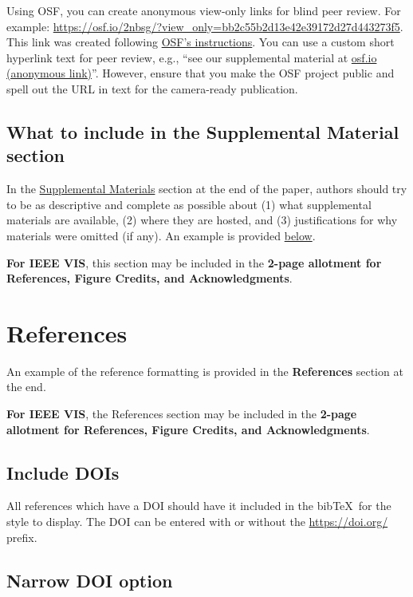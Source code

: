 \documentclass[journal]{vgtc}                     %
\begin{document}
Using OSF, you can create anonymous view-only links for blind peer review.
For example: \url{https://osf.io/2nbsg/?view_only=bb2c55b2d13e42e39172d27d443273f5}.
This link was created following \href{https://help.osf.io/article/201-create-a-view-only-link-for-a-project}{OSF's instructions}.
You can use a custom short hyperlink text for peer review, e.g., ``see our supplemental material at \href{https://osf.io/2nbsg/?view_only=bb2c55b2d13e42e39172d27d443273f5}{osf.io (anonymous link)}''.
However, ensure that you make the OSF project public and spell out the URL in text for the camera-ready publication.


\subsection{What to include in the Supplemental Material section}

In the \hyperref[sec:supplemental_materials]{Supplemental Materials} section at the end of the paper, authors should try to be as descriptive and complete as possible about (1) what supplemental materials are available, (2) where they are hosted, and (3) justifications for why materials were omitted (if any).
An example is provided \hyperref[sec:supplemental_materials]{below}.

\textbf{For IEEE VIS}, this section may be included in the \textbf{2-page allotment for References, Figure Credits, and Acknowledgments}.


\section{References}
\label{sec:references_inst}

An example of the reference formatting is provided in the \textbf{References} section at the end.

\textbf{For IEEE VIS}, the References section may be included in the \textbf{2-page allotment for References, Figure Credits, and Acknowledgments}.

\subsection{Include DOIs}

All references which have a DOI should have it included in the bib\TeX\ for the style to display.
The DOI can be entered with or without the \url{https://doi.org/} prefix.

\subsection{Narrow DOI option}
\end{document}

